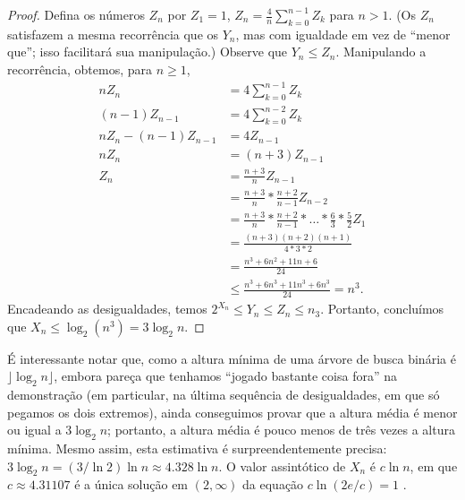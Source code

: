 \begin{proof}
    Defina os números $Z_n$ por $Z_1 = 1$,
    $Z_n = \frac 4 n \sum_{k = 0}^{n-1} Z_k$ para $n > 1$.
    (Os $Z_n$ satisfazem a mesma recorrência que os $Y_n$,
    mas com igualdade em vez de ``menor que'';
    isso facilitará sua manipulação.)
    Observe que $Y_n \leq Z_n$.
    Manipulando a recorrência, obtemos, para $n \geq 1$,
    \begin{align*}
        n Z_n &= 4 \sum_{k = 0}^{n-1} Z_k \\
        (n-1) Z_{n-1} &= 4 \sum_{k = 0}^{n-2} Z_k \\
        n Z_n - (n-1) Z_{n-1} &= 4 Z_{n-1} \\
        n Z_n &= (n+3) Z_{n-1} \\
        Z_n &= \frac{n+3}{n} Z_{n-1} \\
            &= \frac{n+3}{n} * \frac{n+2}{n-1} Z_{n-2} \\
            &= \frac{n+3}{n} * \frac{n+2}{n-1} * \dots * \frac 6 3 * \frac 5 2 Z_1 \\
            &= \frac{(n+3)(n+2)(n+1)}{4*3*2} \\
            &= \frac{n^3 + 6n^2 + 11n + 6}{24} \\
            &\leq \frac {n^3 + 6n^3 + 11n^3 + 6n^3}{24} = n^3.
    \end{align*}
    Encadeando as desigualdades, temos $2^{X_n} \leq Y_n \leq Z_n \leq n_3$.
    Portanto, concluímos que $X_n \leq \log_2(n^3) = 3 \log_2 n$.
\end{proof}

É interessante notar que,
como a altura mínima de uma árvore de busca binária é $\rfloor \log_2 n \rfloor$,
embora pareça que tenhamos ``jogado bastante coisa fora'' na demonstração
(em particular, na última sequência de desigualdades, em que só pegamos os dois extremos),
ainda conseguimos provar que a altura média é menor ou igual a $3 \log_2 n$;
portanto,
a altura média é pouco menos de três vezes a altura mínima.
Mesmo assim,
esta estimativa é surpreendentemente precisa:
$3 \log_2 n = (3/\ln 2) \ln n \approx 4.328 \ln n$.
O valor assintótico de $X_n$ é $c \ln n$,
em que $c \approx 4.31107$ é a única solução em $(2, \infty)$ da equação $c \ln(2e/c) = 1$
\cite[p.~308]{SedgewickFlajolet2013}.
